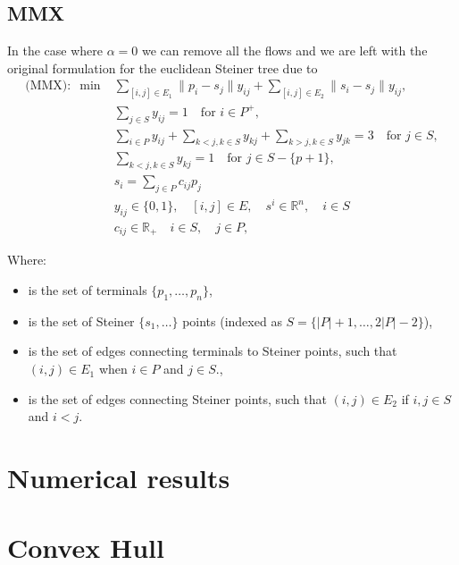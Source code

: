 \documentclass[11pt,reqno,a4paper]{amsart}
\newenvironment{itemizeb}
{\begin{itemize}
     \itemsep=2pt}{
\end{itemize}}
\numberwithin{equation}{section}
\theoremstyle{mytheorem}
\theoremstyle{myremark}
\theoremstyle{myparagraph}
\newcommand{\R}{\mathbb{R}}
\begin{document}
    \subsection{MMX}
    In the case where $\alpha=0$ we can remove all the flows and we are left with the original formulation for the euclidean
    Steiner tree due to~\cite[Section 2]{mmx}
    \begin{align}
        \text{(MMX)}: \; \min &\sum_{[i,j] \in E_1} \|p_i - s_j\| y_{ij} + \sum_{[i,j] \in E_2} \|s_i - s_j\| y_{ij}, \\
        & \sum_{j \in S} y_{ij} = 1 \quad \text{for } i \in P^+, \\
        & \sum_{i \in P} y_{ij} + \sum_{k < j, k \in S} y_{kj} + \sum_{k > j, k \in S} y_{jk} = 3 \quad \text{for } j \in S, \label{MMX:connectivity_steiner} \\
        & \sum_{k < j, k \in S} y_{kj} = 1 \quad \text{for } j \in S - \{p+1\},  \\
        & s_i = \sum_{j \in P} c_{ij} p_j \\
        & y_{ij} \in \{0, 1\}, \quad [i, j] \in E, \quad s^i \in \mathbb{R}^n, \quad i \in S \\
        & c_{ij} \in \R_+ \quad i \in S, \quad j \in P,
    \end{align}

    Where:
    \begin{itemizeb}
         cm=.3 cm
        \item [$P$] is the set of terminals $\{p_1, \ldots, p_n\}$,
        \item [$S$] is the set of Steiner $\{s_1, \ldots\}$ points (indexed as $S = \{|P| + 1, \dots, 2|P|-2\}$),
        \item [$E_1$] is the set of edges connecting terminals to Steiner points, such that $(i,j) \in E_1$ when $i \in P$ and $j \in S$.,
        \item [$E_2$] is the set of edges connecting Steiner points, such that $(i,j) \in E_2$ if $i,j \in S$ and $i < j$.
    \end{itemizeb}


    \section{Numerical results}


    \section{Convex Hull}
\end{document}
